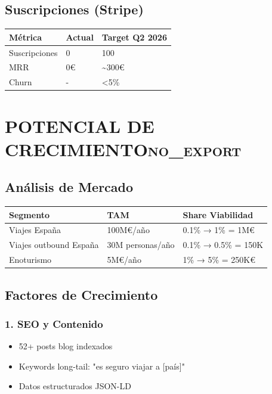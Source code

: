 \documentclass[11pt]{article}
\begin{document}
\subsection{Suscripciones (Stripe)}
\label{sec:orgd21b605}

\begin{center}
\begin{tabular}{lll}
Métrica & Actual & Target Q2 2026\\
\hline
Suscripciones & 0 & 100\\
MRR & 0€ & \textasciitilde{}300€\\
Churn & - & <5\%\\
\end{tabular}
\end{center}

\section{POTENCIAL DE CRECIMIENTO\hfill{}\textsc{no\_export}}
\label{sec:org0d514bc}
\subsection{Análisis de Mercado}
\label{sec:org2378758}

\begin{center}
\begin{tabular}{lll}
Segmento & TAM & Share Viabilidad\\
\hline
Viajes España & 100M€/año & 0.1\% → 1\% = 1M€\\
Viajes outbound España & 30M personas/año & 0.1\% → 0.5\% = 150K\\
Enoturismo & 5M€/año & 1\% → 5\% = 250K€\\
\end{tabular}
\end{center}

\subsection{Factores de Crecimiento}
\label{sec:org97bca0a}

\subsubsection{1. SEO y Contenido}
\label{sec:orgd6c35bd}
\begin{itemize}
\item 52+ posts blog indexados
\item Keywords long-tail: "es seguro viajar a [país]"
\item Datos estructurados JSON-LD
\end{itemize}
\end{document}
